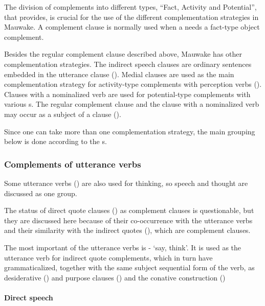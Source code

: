 The division of complements into different types, ``Fact, Activity and Potential'', that \citet[371]{Dixon2010b} provides, is crucial for the use of the different complementation strategies in Mauwake.  A complement clause is normally used when a  needs a fact-type object complement.

Besides the regular complement clause described above, Mauwake has other complementation strategies. The indirect speech clauses are ordinary sentences embedded in the utterance clause (). Medial clauses are used as the main complementation strategy for activity-type complements with perception verbs (). Clauses with a nominalized verb are used for potential-type complements with various s. The regular complement clause and the clause with a nominalized verb may occur as a subject of a clause (). 

Since one  can take more than one complementation strategy, the main grouping below is done according to the s.

\subsubsection{Complements of utterance verbs} \label{sec:8.3.2.1}

Some utterance verbs () are also used for thinking, so speech and thought are discussed as one group. 

The status of direct quote clauses () as complement clauses is questionable, but they are discussed here because of their co-occurrence with the utterance verbs and their similarity with the indirect quotes (), which are complement clauses.  

The most important of the utterance verbs is - `say, think'. It is used as the utterance verb for indirect quote complements, which in turn have grammaticalized, together with the same subject sequential form of the verb, as desiderative () and purpose clauses () and the conative construction () 

\paragraph[Direct speech]{Direct speech} \label{sec:8.3.2.1.1}

